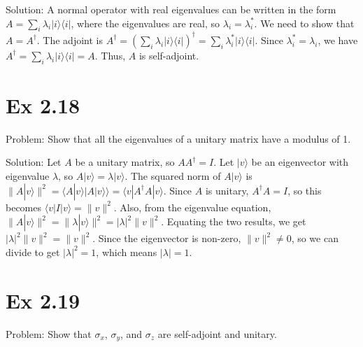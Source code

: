 \documentclass{article}
\newcommand{\0}{{$|0\rangle$}}
\newcommand{\1}{{$|1\rangle$}}
\begin{document}
Solution: A normal operator with real eigenvalues can be written in the form  
$ A = \sum_i \lambda_i |i \rangle \langle i| $, where the eigenvalues are real, so $ \lambda_i = \lambda_i^* $. We need to show that $ A = A^\dagger $. The adjoint is  
$ A^\dagger = \left(\sum_i \lambda_i |i \rangle \langle i|\right)^\dagger = \sum_i \lambda_i^* |i \rangle \langle i| $. Since $ \lambda_i^* = \lambda_i $, we have  
$ A^\dagger = \sum_i \lambda_i |i \rangle \langle i| = A $. Thus, $A$ is self-adjoint.

\newpage
\section*{Ex 2.18  }
Problem: Show that all the eigenvalues of a unitary matrix have a modulus of 1.  

Solution: Let $A$ be a unitary matrix, so $ A A^\dagger = I $. Let $ |v \rangle $ be an eigenvector with eigenvalue $ \lambda $, so $ A |v \rangle = \lambda |v \rangle $. The squared norm of $ A|v \rangle $ is  
$ \|A|v \rangle\|^2 = \langle A|v \rangle | A|v \rangle \rangle = \langle v|A^\dagger A|v \rangle $. Since $A$ is unitary, $ A^\dagger A = I $, so this becomes  
$ \langle v|I|v \rangle = \|v\|^2 $. Also, from the eigenvalue equation,  
$ \|A|v \rangle\|^2 = \|\lambda|v \rangle\|^2 = |\lambda|^2 \|v\|^2 $. Equating the two results, we get  
$ |\lambda|^2 \|v\|^2 = \|v\|^2 $. Since the eigenvector is non-zero, $ \|v\|^2 \neq 0 $, so we can divide to get  
$ |\lambda|^2 = 1 $, which means $ |\lambda| = 1 $.

\newpage
\section*{Ex 2.19  }
Problem: Show that $ \sigma_x $, $ \sigma_y $, and $ \sigma_z $ are self-adjoint and unitary.  
\end{document}
